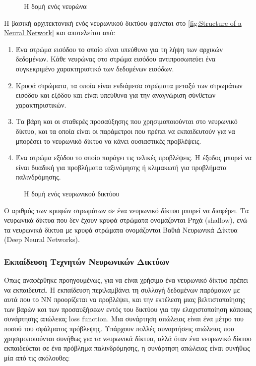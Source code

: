 \begin{figure}[H]
    \centering
    
    \caption{Η δομή ενός νευρώνα}
    \label{fig:The Structure of a Neuron}
    

\end{figure}


Η βασική αρχιτεκτονική ενός νευρωνικού δικτύου φαίνεται στο \autoref{fig:Structure of a Neural Network} και  αποτελείται από:

\begin{enumerate}
\def\labelenumi{\arabic{enumi}.}
\item
  Ένα στρώμα εισόδου το οποίο είναι υπεύθυνο για τη λήψη των αρχικών δεδομένων. 
  Κάθε νευρώνας στο στρώμα εισόδου αντιπροσωπεύει ένα συγκεκριμένο χαρακτηριστικό των δεδομένων εισόδων.
\item
  Κρυφά στρώματα, τα οποία είναι ενδιάμεσα στρώματα μεταξύ των στρωμάτων εισόδου και
  εξόδου και είναι υπεύθυνα για την αναγνώριση σύνθετων χαρακτηριστικών.
\item
  Τα βάρη και οι σταθερές προσαύξησης που χρησιμοποιούνται στο νευρωνικό δίκτυο, και τα οποία είναι οι παράμετροι που πρέπει να εκπαιδευτούν για να μπορέσει το νευρωνικό δίκτυο
  να κάνει ουσιαστικές προβλέψεις.
\item
  Ένα στρώμα εξόδου το οποίο παράγει τις τελικές προβλέψεις. Η έξοδος μπορεί
  να είναι δυαδική για προβλήματα ταξινόμησης ή κλιμακωτή για προβλήματα παλινδρόμησης.
\end{enumerate}

\begin{figure}[H]
    \centering
    
    \caption{Η δομή ενός νευρωνικού δικτύου \cite{takyar2025}}
    \label{fig:Structure of a Neural Network}


\end{figure}

Ο αριθμός των κρυφών στρωμάτων σε ένα νευρωνικό δίκτυο μπορεί να διαφέρει. Τα νευρωνικά δίκτυα που δεν έχουν κρυφά στρώματα ονομάζονται Ρηχά (\textlatin{shallow}), ενώ τα νευρωνικά δίκτυα με κρυφά στρώματα ονομάζονται Βαθιά Νευρωνικά Δίκτυα \textlatin{(Deep Neural Networks)}.


\subsubsection{Εκπαίδευση Τεχνητών Νευρωνικών Δικτύων}

Όπως αναφέρθηκε προηγουμένως, για να είναι χρήσιμο ένα νευρωνικό δίκτυο πρέπει να εκπαιδευτεί. Η εκπαίδευση περιλαμβάνει τη συλλογή δεδομένων παρόμοιων με αυτά που το \textlatin{ΝΝ} προορίζεται να προβλέψει, και την εκτέλεση μιας βελτιστοποίησης των βαρών και των προσαυξήσεων εντός του δικτύου για την ελαχιστοποίηση κάποιας συνάρτησης απώλειας \textlatin{loss function}. Μια συνάρτηση απώλειας είναι ένα μέτρο του ποσού του σφάλματος πρόβλεψης. Υπάρχουν πολλές συναρτήσεις απώλειας που χρησιμοποιούνται συνήθως για τα νευρωνικά δίκτυα, αλλά όταν ένα νευρωνικό δίκτυο εκπαιδεύεται σε ένα πρόβλημα παλινδρόμησης, η συνάρτηση απώλειας είναι συνήθως μία από τις ακόλουθες:

